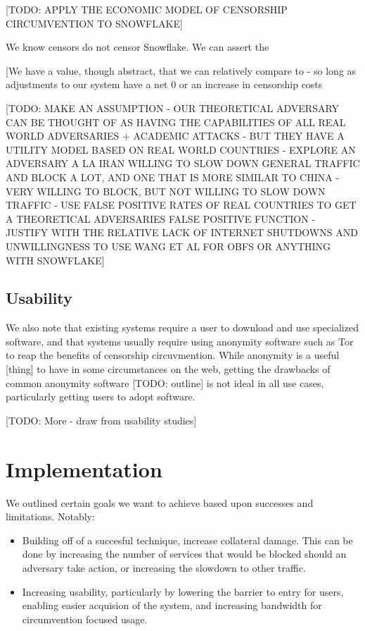 \documentclass[12pt]{report}
\begin{document}
[TODO: APPLY THE ECONOMIC MODEL OF CENSORSHIP CIRCUMVENTION TO SNOWFLAKE]

We know censors do not censor Snowflake. We can assert the 

[We have a value, though abstract, that we can relatively compare to - so long as adjustments to our system have a net 0 or an increase in censorship costs

[TODO: MAKE AN ASSUMPTION - OUR THEORETICAL ADVERSARY CAN BE THOUGHT OF AS HAVING THE CAPABILITIES OF ALL REAL WORLD ADVERSARIES + ACADEMIC ATTACKS - BUT THEY HAVE A UTILITY MODEL BASED ON REAL WORLD COUNTRIES - EXPLORE AN ADVERSARY A LA IRAN WILLING TO SLOW DOWN GENERAL TRAFFIC AND BLOCK A LOT, AND ONE THAT IS MORE SIMILAR TO CHINA - VERY WILLING TO BLOCK, BUT NOT WILLING TO SLOW DOWN TRAFFIC - USE FALSE POSITIVE RATES OF REAL COUNTRIES TO GET A THEORETICAL ADVERSARIES FALSE POSITIVE FUNCTION - JUSTIFY WITH THE RELATIVE LACK OF INTERNET SHUTDOWNS AND UNWILLINGNESS TO USE WANG ET AL FOR OBFS OR ANYTHING WITH SNOWFLAKE]

\subsection{Usability}

We also note that existing systems require a user to download and use specialized software, and that systems usually require using anonymity software such as Tor to reap the benefits of censorship circuvmention. While anonymity is a useful [thing] to have in some circumstances on the web, getting the drawbacks of common anonymity software [TODO: outline] is not ideal in all use cases, particularly getting users to adopt software.

[TODO: More - draw from usability studies]

\section{Implementation}

We outlined certain goals we want to achieve based upon successes and limitations. Notably:
\begin{itemize}
  \item Building off of a succesful technique, increase collateral damage. This can be done by increasing the number of services that would be blocked should an adversary take action, or increasing the slowdown to other traffic.
  \item Increasing usability, particularly by lowering the barrier to entry for users, enabling easier acquision of the system, and increasing bandwidth for circumvention focused usage.
\end{itemize}
\end{document}
